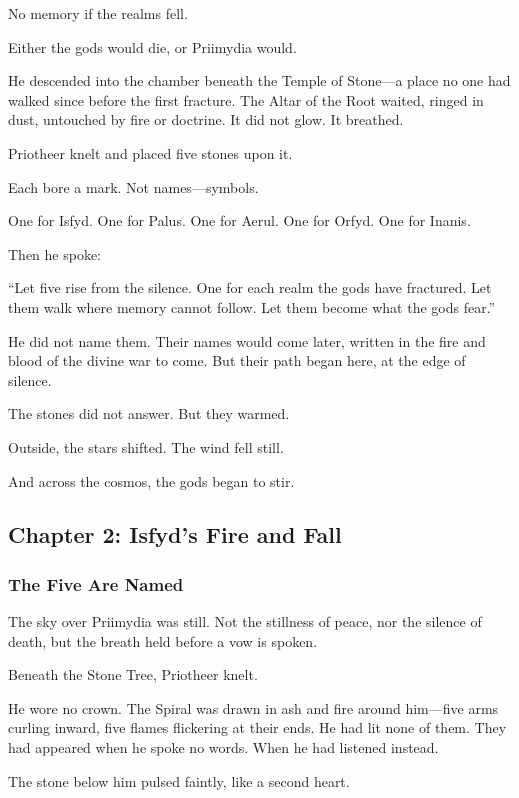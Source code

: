 \documentclass[12pt]{article}
\begin{document}
No memory if the realms fell. 

Either the gods would die, or Priimydia would.

He descended into the chamber beneath the Temple of Stone—a place no one had walked since before the first fracture. The Altar of the Root waited, ringed in dust, untouched by fire or doctrine. It did not glow. It breathed.

Priotheer knelt and placed five stones upon it.

Each bore a mark. Not names—symbols.

One for Isfyd. One for Palus. One for Aerul. One for Orfyd. One for Inanis.

Then he spoke:

“Let five rise from the silence. One for each realm the gods have fractured.  
Let them walk where memory cannot follow.  
Let them become what the gods fear.”

He did not name them. Their names would come later, written in the fire and blood of the divine war to come. But their path began here, at the edge of silence.

The stones did not answer. But they warmed.

Outside, the stars shifted. The wind fell still.

And across the cosmos, the gods began to stir.

\newpage

\subsection{Chapter 2: Isfyd's Fire and Fall}

\vspace{.5in}

\subsubsection{The Five Are Named}

The sky over Priimydia was still. Not the stillness of peace, nor the silence of death, but the breath held before a vow is spoken.

Beneath the Stone Tree, Priotheer knelt.

He wore no crown. The Spiral was drawn in ash and fire around him—five arms curling inward, five flames flickering at their ends. He had lit none of them. They had appeared when he spoke no words. When he had listened instead.

The stone below him pulsed faintly, like a second heart.
\end{document}

